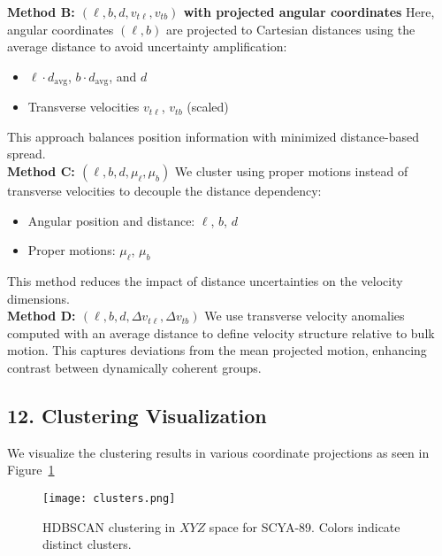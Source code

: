 \documentclass[11pt]{article}
\begin{document}
\textbf{Method B: $(\ell, b, d, v_{t\ell}, v_{tb})$ with projected angular coordinates}
Here, angular coordinates $(\ell, b)$ are projected to Cartesian distances using the average distance to avoid uncertainty amplification:
\begin{itemize}
  \item $\ell \cdot d_{\text{avg}}$, $b \cdot d_{\text{avg}}$, and $d$
  \item Transverse velocities $v_{t\ell}$, $v_{tb}$ (scaled)
\end{itemize}
This approach balances position information with minimized distance-based spread.\\

\textbf{Method C: $(\ell, b, d, \mu_\ell, \mu_b)$}
We cluster using proper motions instead of transverse velocities to decouple the distance dependency:
\begin{itemize}
  \item Angular position and distance: $\ell$, $b$, $d$
  \item Proper motions: $\mu_\ell$, $\mu_b$
\end{itemize}
This method reduces the impact of distance uncertainties on the velocity dimensions.\\

\textbf{Method D: $(\ell, b, d, \Delta v_{t\ell}, \Delta v_{tb})$}
We use transverse velocity anomalies computed with an average distance to define velocity structure relative to bulk motion. This captures deviations from the mean projected motion, enhancing contrast between dynamically coherent groups.

\subsection*{12. Clustering Visualization}
We visualize the clustering results in various coordinate projections as seen in Figure~\ref{fig:clusters}

\begin{figure}[H]
    \centering
    \texttt{[image: clusters.png]}
    \caption{HDBSCAN clustering in $XYZ$ space for SCYA-89. Colors indicate distinct clusters.}
    \label{fig:clusters}
\end{figure}
\end{document}
